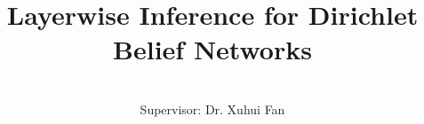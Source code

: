 \title{Layerwise Inference for Dirichlet Belief Networks}


\author{\Authornameonly\\{\bigskip}Supervisor: Dr. Xuhui Fan}

\copyrightfalse
\figurespagefalse
\tablespagefalse
